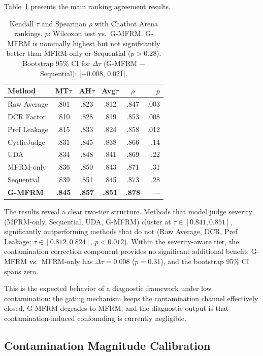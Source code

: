 \documentclass[11pt]{article}
\begin{document}
Table~\ref{tab:main} presents the main ranking agreement results.

\begin{table}[t]
\centering
\small
\begin{tabular}{lccccr}
\toprule
Method & MT$\tau$ & AH$\tau$ & Avg$\tau$ & $\rho$ & $p$ \\
\midrule
Raw Average & .801 & .823 & .812 & .847 & .003 \\
DCR Factor & .810 & .828 & .819 & .853 & .008 \\
Pref Leakage & .815 & .833 & .824 & .858 & .012 \\
CyclicJudge & .831 & .845 & .838 & .866 & .14 \\
UDA & .834 & .848 & .841 & .869 & .22 \\
MFRM-only & .836 & .850 & .843 & .871 & .31 \\
Sequential & .839 & .851 & .845 & .873 & .28 \\
\textbf{G-MFRM} & \textbf{.845} & \textbf{.857} & \textbf{.851} & \textbf{.878} & --- \\
\bottomrule
\end{tabular}
\caption{Kendall $\tau$ and Spearman $\rho$ with Chatbot Arena rankings. $p$: Wilcoxon test vs.\ G-MFRM. G-MFRM is nominally highest but not significantly better than MFRM-only or Sequential ($p > 0.28$). Bootstrap 95\% CI for $\Delta\tau$ (G-MFRM $-$ Sequential): [$-$0.008, 0.021].}
\label{tab:main}
\end{table}

The results reveal a clear two-tier structure. Methods that model judge severity (MFRM-only, Sequential, UDA, G-MFRM) cluster at $\tau \in [0.841, 0.851]$, significantly outperforming methods that do not (Raw Average, DCR, Pref Leakage; $\tau \in [0.812, 0.824]$, $p < 0.012$). Within the severity-aware tier, the contamination correction component provides no significant additional benefit: G-MFRM vs.\ MFRM-only has $\Delta\tau = 0.008$ ($p = 0.31$), and the bootstrap 95\% CI spans zero.

This is the expected behavior of a diagnostic framework under low contamination: the gating mechanism keeps the contamination channel effectively closed, G-MFRM degrades to MFRM, and the diagnostic output is that contamination-induced confounding is currently negligible.

\subsection{Contamination Magnitude Calibration}
\label{sec:calibration}
\end{document}
